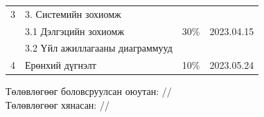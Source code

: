 \begin{titlepage}
\begin{center}
\begin{tabular}{|c|p{7cm}|c|c|}
	3 & {3. Системийн зохиомж}     &   &  \\
    & 3.1 Дэлгэцийн зохиомж & 30\%&2023.04.15 \\
    & 3.2 Үйл ажиллагааны диаграммууд & &\\ \hline
	4 & {Ерөнхий дүгнэлт} & 10\% & 2023.05.24 \\ \hline
\end{tabular}

\vspace{2cm}
Төлөвлөгөөг боловсруулсан оюутан: \makebox[3cm]{\dotfill} /\shortname/\\

\vspace{1cm}
Төлөвлөгөөг хянасан: \makebox[3cm]{\dotfill} /\chairname/

\end{center}
\end{titlepage}


\newpage

